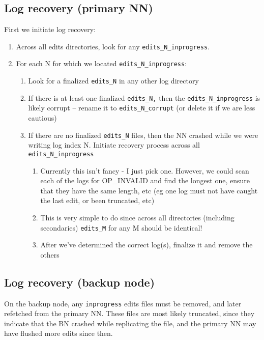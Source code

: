 \documentclass{article}
\begin{document}
\subsection{Log recovery (primary NN)}\label{logrecovery}
First we initiate log recovery:
\begin{enumerate}
  \item Across all edits directories, look for any {\tt edits\_N\_inprogress}.
  \item For each N for which we located {\tt edits\_N\_inprogress}:
  \begin{enumerate}
    \item Look for a finalized {\tt edits\_N} in any other log directory
    \item If there is at least one finalized {\tt edits\_N,} then the {\tt edits\_N\_inprogress} is likely corrupt – rename it to {\tt edits\_N\_corrupt} (or delete it if we are less cautious)
    \item If there are no finalized {\tt edits\_N} files, then the NN crashed while we were writing log index N. Initiate recovery process across all {\tt edits\_N\_inprogress}
    \begin{enumerate}
      \item  Currently this isn't fancy - I just pick one. However, we could scan each of the logs for OP\_INVALID and find the longest one, ensure that they have the same length, etc (eg one log must not have caught the last edit, or been truncated, etc)
      \item  This is very simple to do since across all directories (including secondaries) {\tt edits\_M} for any M should be identical!
      \item  After we've determined the correct log(s), finalize it and remove the others
    \end{enumerate}
  \end{enumerate}
\end{enumerate}

\subsection{Log recovery (backup node)}\label{bnrecovery}

On the backup node, any {\tt inprogress} edits files must be removed, and later refetched from the primary NN.
These files are most likely truncated, since they indicate that the BN crashed while replicating the file, and the
primary NN may have flushed more edits since then.
\end{document}
